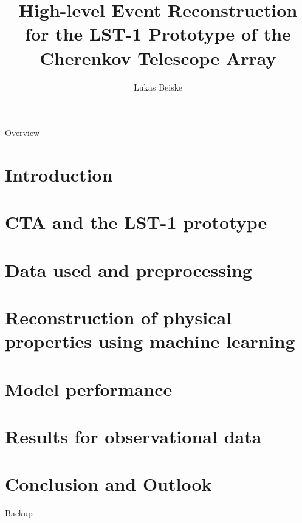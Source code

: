 \documentclass[aspectratio=1610, 9pt]{beamer}
\title{High-level Event Reconstruction for the LST-1 Prototype of the Cherenkov Telescope Array}
\author[L.~Beiske]{Lukas Beiske}
\institute[E5b]{E5b Astroparticle Physics \\  Department of Physics - TU Dortmund}
\begin{document}
\maketitle

\begin{frame}{Overview}
  \tableofcontents
\end{frame}

\section{Introduction}



\section{CTA and the LST-1 prototype}


\section{Data used and preprocessing}


\section{Reconstruction of physical properties using machine learning}


\section{Model performance}


\section{Results for observational data}


\section{Conclusion and Outlook}


\begin{frame}
  \centering 
  \Huge\color{tugreen} Backup
\end{frame}


\end{document}
